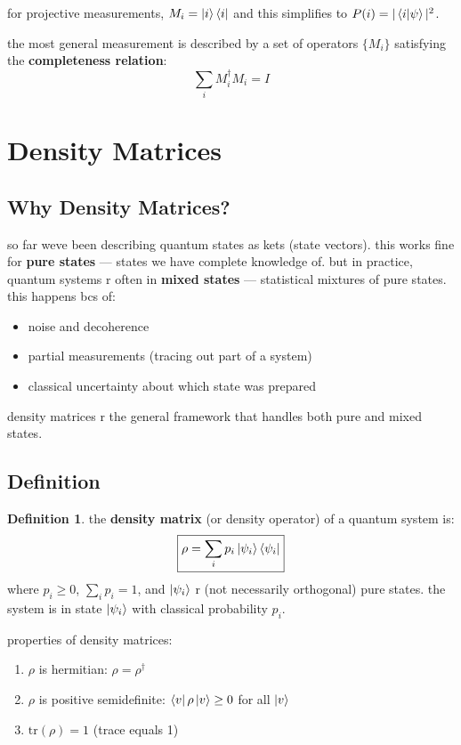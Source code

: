 \documentclass[11pt,a4paper]{article}
\theoremstyle{definition}
\newtheorem{definition}{Definition}[section]
\theoremstyle{remark}
\begin{document}
for projective measurements, $M_i = \ket{i}\bra{i}$ and this simplifies to $P(i) = |\braket{i|\psi}|^2$.

the most general measurement is described by a set of operators $\{M_i\}$ satisfying the \textbf{completeness relation}:
\[
\sum_i M_i^\dagger M_i = I
\]

\section{Density Matrices}

\subsection{Why Density Matrices?}

so far weve been describing quantum states as kets (state vectors). this works fine for \textbf{pure states} --- states we have complete knowledge of. but in practice, quantum systems r often in \textbf{mixed states} --- statistical mixtures of pure states. this happens bcs of:

\begin{itemize}
    \item noise and decoherence
    \item partial measurements (tracing out part of a system)
    \item classical uncertainty about which state was prepared
\end{itemize}

density matrices r the general framework that handles both pure and mixed states.

\subsection{Definition}

\begin{definition}
the \textbf{density matrix} (or density operator) of a quantum system is:
\[
\boxed{\rho = \sum_i p_i \ket{\psi_i}\bra{\psi_i}}
\]
where $p_i \geq 0$, $\sum_i p_i = 1$, and $\ket{\psi_i}$ r (not necessarily orthogonal) pure states. the system is in state $\ket{\psi_i}$ with classical probability $p_i$.
\end{definition}

properties of density matrices:
\begin{enumerate}[label=(\roman*)]
    \item $\rho$ is hermitian: $\rho = \rho^\dagger$
    \item $\rho$ is positive semidefinite: $\bra{v}\rho\ket{v} \geq 0$ for all $\ket{v}$
    \item $\text{tr}(\rho) = 1$ (trace equals 1)
\end{enumerate}
\end{document}
